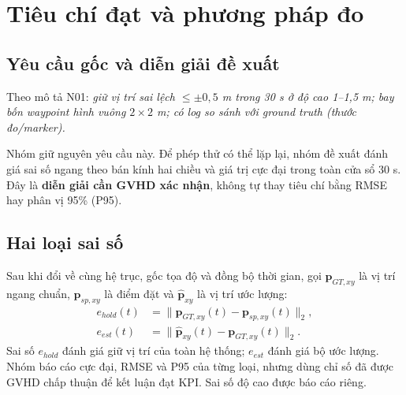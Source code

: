 \documentclass[a4paper,12pt]{article}
\begin{document}
\section{Tiêu chí đạt và phương pháp đo}
\subsection{Yêu cầu gốc và diễn giải đề xuất}
Theo mô tả N01\cite{assignment}: \textit{giữ vị trí sai lệch $\leq\pm0{,}5$ m trong 30 s ở độ cao 1–1,5 m; bay bốn waypoint hình vuông $2\times2$ m; có log so sánh với ground truth (thước đo/marker).}

Nhóm giữ nguyên yêu cầu này. Để phép thử có thể lặp lại, nhóm đề xuất đánh giá sai số ngang theo bán kính hai chiều và giá trị cực đại trong toàn cửa sổ 30 s. Đây là \textbf{diễn giải cần GVHD xác nhận}, không tự thay tiêu chí bằng RMSE hay phân vị 95\% (P95).

\subsection{Hai loại sai số}
Sau khi đổi về cùng hệ trục, gốc tọa độ và đồng bộ thời gian, gọi $\mathbf p_{GT,xy}$ là vị trí ngang chuẩn, $\mathbf p_{sp,xy}$ là điểm đặt và $\hat{\mathbf p}_{xy}$ là vị trí ước lượng:
\begin{align}
 e_{hold}(t)&=\|\mathbf p_{GT,xy}(t)-\mathbf p_{sp,xy}(t)\|_2,\\
 e_{est}(t)&=\|\hat{\mathbf p}_{xy}(t)-\mathbf p_{GT,xy}(t)\|_2.
\end{align}
Sai số $e_{hold}$ đánh giá giữ vị trí của toàn hệ thống; $e_{est}$ đánh giá bộ ước lượng. Nhóm báo cáo cực đại, RMSE và P95 của từng loại, nhưng dùng chỉ số đã được GVHD chấp thuận để kết luận đạt KPI. Sai số độ cao được báo cáo riêng.
\end{document}
